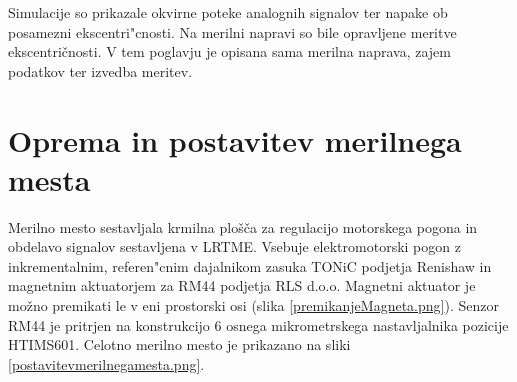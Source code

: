 %
%


Simulacije so prikazale okvirne poteke analognih signalov ter napake  ob posamezni ekscentri"cnosti.
Na merilni napravi so bile opravljene meritve ekscentričnosti. V tem poglavju je opisana sama merilna naprava, zajem podatkov ter izvedba meritev.

\section{Oprema in postavitev merilnega mesta}

Merilno mesto sestavljala krmilna plošča za regulacijo motorskega pogona in obdelavo signalov sestavljena v LRTME.
Vsebuje elektromotorski pogon z inkrementalnim, referen"cnim dajalnikom zasuka TONiC podjetja Renishaw in magnetnim aktuatorjem za RM44 podjetja RLS  d.o.o.
Magnetni aktuator je možno premikati le v eni prostorski osi (slika \ref{premikanjeMagneta.png}).
Senzor RM44 je pritrjen na konstrukcijo 6 osnega mikrometrskega nastavljalnika pozicije HTIMS601.
Celotno merilno mesto je prikazano na sliki \ref{postavitevmerilnegamesta.png}.



